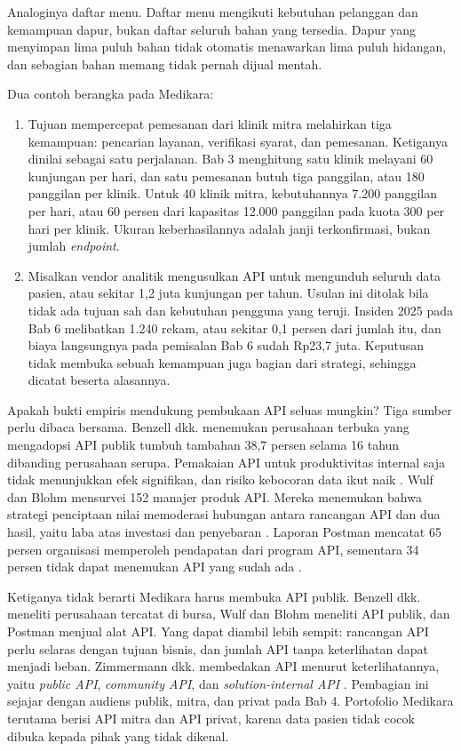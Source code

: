 Analoginya daftar menu. Daftar menu mengikuti kebutuhan pelanggan dan kemampuan dapur, bukan daftar seluruh bahan yang
tersedia. Dapur yang menyimpan lima puluh bahan tidak otomatis menawarkan lima puluh hidangan, dan sebagian bahan memang
tidak pernah dijual mentah.

Dua contoh berangka pada Medikara:
\begin{enumerate}
  \item Tujuan mempercepat pemesanan dari klinik mitra melahirkan tiga kemampuan: pencarian layanan, verifikasi syarat, dan
        pemesanan. Ketiganya dinilai sebagai satu perjalanan. Bab 3 menghitung satu klinik melayani 60 kunjungan per hari,
        dan satu pemesanan butuh tiga panggilan, atau 180 panggilan per klinik. Untuk 40 klinik mitra, kebutuhannya 7.200
        panggilan per hari, atau 60 persen dari kapasitas 12.000 panggilan pada kuota 300 per hari per klinik. Ukuran
        keberhasilannya adalah janji terkonfirmasi, bukan jumlah \textit{endpoint}.
  \item Misalkan vendor analitik mengusulkan API untuk mengunduh seluruh data pasien, atau sekitar 1,2 juta kunjungan per
        tahun. Usulan ini ditolak bila tidak ada tujuan sah dan kebutuhan pengguna yang teruji. Insiden 2025 pada Bab 6
        melibatkan 1.240 rekam, atau sekitar 0,1 persen dari jumlah itu, dan biaya langsungnya pada pemisalan Bab 6 sudah
        Rp23,7 juta. Keputusan tidak membuka sebuah kemampuan juga bagian dari strategi, sehingga dicatat beserta
        alasannya.
\end{enumerate}

Apakah bukti empiris mendukung pembukaan API seluas mungkin? Tiga sumber perlu dibaca bersama. Benzell dkk. menemukan
perusahaan terbuka yang mengadopsi API publik tumbuh tambahan 38,7 persen selama 16 tahun dibanding perusahaan serupa.
Pemakaian API untuk produktivitas internal saja tidak menunjukkan efek signifikan, dan risiko kebocoran data ikut naik
\cite{benzell2024apis}. Wulf dan Blohm mensurvei 152 manajer produk API. Mereka menemukan bahwa strategi penciptaan nilai
memoderasi hubungan antara rancangan API dan dua hasil, yaitu laba atas investasi dan penyebaran \cite{c08-wulf2020}.
Laporan Postman mencatat 65 persen organisasi memperoleh pendapatan dari program API, sementara 34 persen tidak dapat
menemukan API yang sudah ada \cite{postman2025}.

Ketiganya tidak berarti Medikara harus membuka API publik. Benzell dkk. meneliti perusahaan tercatat di bursa, Wulf dan
Blohm meneliti API publik, dan Postman menjual alat API. Yang dapat diambil lebih sempit: rancangan API perlu selaras dengan
tujuan bisnis, dan jumlah API tanpa keterlihatan dapat menjadi beban. Zimmermann dkk. membedakan API menurut
keterlihatannya, yaitu \textit{public API}, \textit{community API}, dan \textit{solution-internal API}
\cite{zimmermann2022patterns}. Pembagian ini sejajar dengan audiens publik, mitra, dan privat pada Bab 4. Portofolio
Medikara terutama berisi API mitra dan API privat, karena data pasien tidak cocok dibuka kepada pihak yang tidak dikenal.

